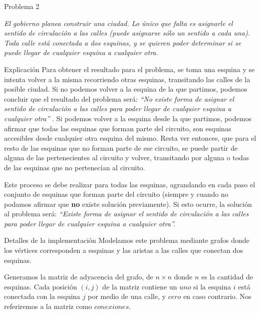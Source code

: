 \begin{section}{Problema 2}

	\textit{El gobierno planea construir una ciudad. Lo único que falta es asignarle el sentido de circulación a las calles (puede asignarse sólo un sentido a cada una). Toda calle está conectada a dos esquinas, y se quieren poder determinar si se puede llegar de cualquier esquina a cualquier otra.}
		
	\begin{subsection}{Explicación}
	Para obtener el resultado para el problema, se toma una esquina y se intenta volver a la misma recorriendo otras esquinas, transitando las calles de la posible ciudad. Si no podemos volver a la esquina de la que partimos, podemos concluir que el resultado del problema será: {\em ``No existe forma de asignar el sentido de circulación a las calles para poder llegar de cualquier esquina a cualquier otra'' }. Si podemos volver a la esquina desde la que partimos, podemos afirmar que todas las esquinas que forman parte del circuito, son esquinas accesibles desde cualquier otra esquina del mismo. Resta ver entonces, que para el resto de las esquinas que no forman parte de ese circuito, se puede partir de alguna de las pertenecientes al circuito y volver, transitando por alguna o todas de las esquinas que no pertenecían al circuito. 
	
	Este proceso se debe realizar para todas las esquinas, agrandando en cada paso el conjunto de esquinas que forman parte del circuito (siempre y cuando no podamos afirmar que \textbf{no} existe solución previamente). Si esto ocurre, la solución al problema será: {\em ``Existe forma de asignar el sentido de circulación a las calles para poder llegar de cualquier esquina a cualquier otra''. }
		
	\end{subsection}

	\begin{subsection}{Detalles de la implementación}
		Modelamos este problema mediante grafos donde los vértices corresponden a esquinas y las aristas a las calles que conectan dos esquinas.	

		Generamos la matriz de adyacencia del grafo, de $n\times n$ donde $n$ es la cantidad de esquinas. Cada posición $(i,j)$ de la matriz contiene un $uno$ si la esquina $i$ está conectada con la esquina $j$ por medio de una calle, y $cero$ en caso contrario. Nos referiremos a la matriz como $conexiones$.



\end{subsection}
\end{section}
